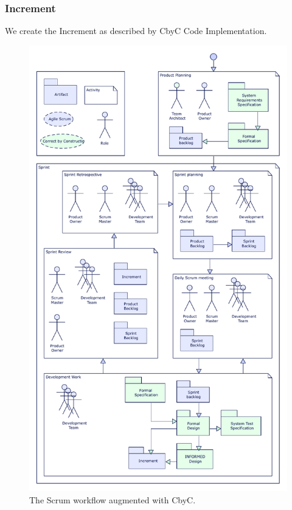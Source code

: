 \subsubsection{Increment}
We create the Increment as described by CbyC Code Implementation.


\begin{figure}[H]
	\centering
	\includegraphics[scale=0.75]{Figures/Scrum_CbyC_workflow.pdf}
	\decoRule
	\caption{The Scrum workflow augmented with CbyC.}
	\label{fig:ScrumCbyCWorkflow}
\end{figure}